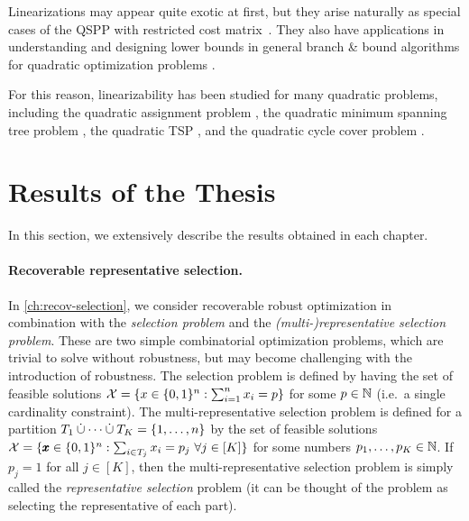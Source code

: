 Linearizations may appear quite exotic at first, but they arise naturally as special cases of the QSPP with restricted cost matrix~\cite{huSo2018}. They also have applications in understanding and designing lower bounds in general branch \& bound algorithms for quadratic optimization problems \cite{huSo2021}. 

For this reason, linearizability has been studied for many quadratic problems, including the quadratic assignment problem
 \cite{CeDeWo2016,Erdogan2006,ErTa2007,ErTa2011,kabadi2011n,punnen2013linear,waddellcharacterizing}, 
 the quadratic minimum spanning tree problem \cite{CuPu2018,sotirov2021quadratic},   the quadratic TSP \cite{PuWaWo2017}, and  the quadratic cycle cover problem \cite{deMeSo2020}.  


\section{Results of the Thesis}
\label{sec:thesis-results}

In this section, we extensively describe the results obtained in each chapter.

\paragraph*{Recoverable representative selection.}
In \cref{ch:recov-selection}, we consider recoverable robust optimization in combination with the \emph{selection problem} and the \emph{(multi-)representative selection problem}. 
These are two simple combinatorial optimization problems, which are trivial to solve without robustness, but may become challenging with the introduction of robustness. 
The selection problem is defined by having the set of feasible solutions $\mathcal{X} = \{ x \in \{ 0,1 \}^n : \sum_{i=1}^n x_i = p \}$ for some $p \in \mathbb{N}$ (i.e.\ a single cardinality constraint). 
The multi-representative selection problem is defined for a partition $T_1 \dotunion \dots \dotunion T_K = \fromto{1}{n}$ by the set of feasible solutions $\mathcal{X} = \{  \pmb{x}\in \{0,1\}^n : \sum_{i\in T_j} x_i = p_j\ \forall j \in [K]  \}$ for some numbers $p_1,\dots,p_K \in \mathbb{N}$. If $p_j = 1$ for all $j \in [K]$, then the multi-representative selection problem is simply called the \emph{representative selection} problem (it can be thought of the problem as selecting the representative of each part).

